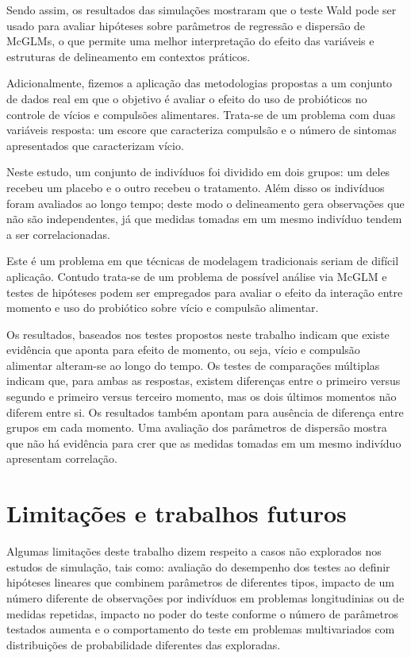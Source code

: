 Sendo assim, os resultados das simulações mostraram que o teste Wald pode ser usado para avaliar hipóteses sobre parâmetros de regressão e dispersão de McGLMs, o que permite uma melhor interpretação do efeito das variáveis e estruturas de delineamento em contextos práticos.

Adicionalmente, fizemos a aplicação das metodologias propostas a um conjunto de dados real em que o objetivo é avaliar o efeito do uso de probióticos no controle de vícios e compulsões alimentares. Trata-se de um problema com duas variáveis resposta: um escore que caracteriza compulsão e o número de sintomas apresentados que caracterizam vício. 

Neste estudo, um conjunto de indivíduos foi dividido em dois grupos: um deles recebeu um placebo e o outro recebeu o tratamento. Além disso os indivíduos foram avaliados ao longo tempo; deste modo o delineamento gera observações que não são independentes, já que medidas tomadas em um mesmo indivíduo tendem a ser correlacionadas. 

Este é um problema em que técnicas de modelagem tradicionais seriam de difícil aplicação. Contudo trata-se de um problema de possível análise via McGLM e testes de hipóteses podem ser empregados para avaliar o efeito da interação entre momento e uso do probiótico sobre vício e compulsão alimentar.

Os resultados, baseados nos testes propostos neste trabalho indicam que existe evidência que aponta para efeito de momento, ou seja, vício e compulsão alimentar alteram-se ao longo do tempo. Os testes de comparações múltiplas indicam que, para ambas as respostas, existem diferenças entre o primeiro versus segundo e primeiro versus terceiro momento, mas os dois últimos momentos não diferem entre si. Os resultados também apontam para ausência de diferença entre grupos em cada momento. Uma avaliação dos parâmetros de dispersão mostra que não há evidência para crer que as medidas tomadas em um mesmo indivíduo apresentam correlação.


\section{Limitações e trabalhos futuros}

Algumas limitações deste trabalho dizem respeito a casos não explorados nos estudos de simulação, tais como: avaliação do desempenho dos testes ao definir hipóteses lineares que combinem parâmetros de diferentes tipos, impacto de um número diferente de observações por indivíduos em problemas longitudinias ou de medidas repetidas, impacto no poder do teste conforme o número de parâmetros testados aumenta e o comportamento do teste em problemas multivariados com distribuições de probabilidade diferentes das exploradas.


